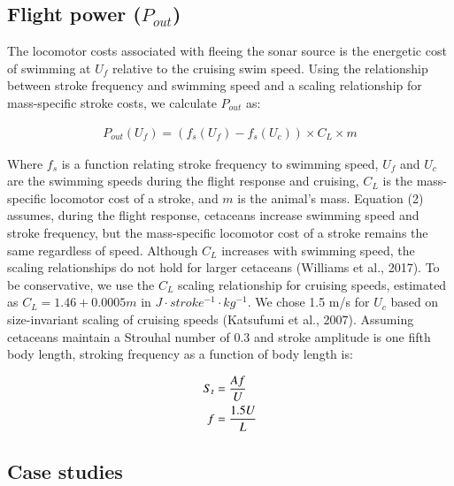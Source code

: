 \documentclass[]{elsarticle} %
\begin{document}
\subsection{\texorpdfstring{Flight power
(\(P_{out}\))}{Flight power (P\_\{out\})}}\label{flight-power-p_out}

The locomotor costs associated with fleeing the sonar source is the
energetic cost of swimming at \(U_f\) relative to the cruising swim
speed. Using the relationship between stroke frequency and swimming
speed and a scaling relationship for mass-specific stroke costs, we
calculate \(P_{out}\) as:

\begin{align}
P_{out}(U_f) = (f_s(U_f) - f_s(U_c)) \times C_L \times m
\end{align}

Where \(f_s\) is a function relating stroke frequency to swimming speed,
\(U_f\) and \(U_c\) are the swimming speeds during the flight response
and cruising, \(C_L\) is the mass-specific locomotor cost of a stroke,
and \(m\) is the animal's mass. Equation (2) assumes, during the flight
response, cetaceans increase swimming speed and stroke frequency, but
the mass-specific locomotor cost of a stroke remains the same regardless
of speed. Although \(C_L\) increases with swimming speed, the scaling
relationships do not hold for larger cetaceans (Williams et al., 2017).
To be conservative, we use the \(C_L\) scaling relationship for cruising
speeds, estimated as \(C_L = 1.46 + 0.0005m\) in
\(J \cdot stroke^{-1} \cdot kg^{-1}\). We chose 1.5 m/s for \(U_c\)
based on size-invariant scaling of cruising speeds (Katsufumi et al.,
2007). Assuming cetaceans maintain a Strouhal number of 0.3 and stroke
amplitude is one fifth body length, stroking frequency as a function of
body length is:

\begin{align}
S_t &= \frac{Af}{U} \notag\\
f &= \frac{1.5U}{L}
\end{align}

\subsection{Case studies}\label{case-studies}
\end{document}
